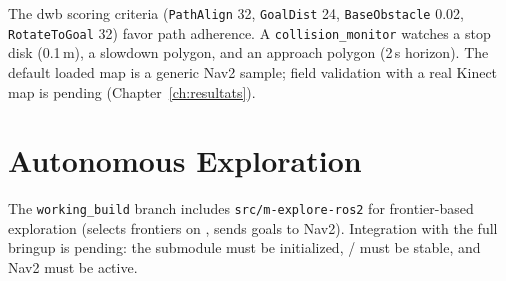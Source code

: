 The \gls{dwb} scoring criteria (\texttt{PathAlign} 32, \texttt{GoalDist} 24, \texttt{BaseObstacle} 0.02, \texttt{RotateToGoal} 32) favor path adherence. A \texttt{collision\_monitor} watches a stop disk (0.1\,m), a slowdown polygon, and an approach polygon (2\,s horizon). The default loaded map is a generic Nav2 sample; field validation with a real Kinect map is pending (Chapter~\ref{ch:resultats}).

\section{Autonomous Exploration}
\label{sec:slam_exploration}

The \texttt{working\_build} branch includes \texttt{src/m-explore-ros2} for frontier-based exploration (selects frontiers on , sends goals to Nav2). Integration with the full bringup is pending: the submodule must be initialized, / must be stable, and Nav2 must be active.
